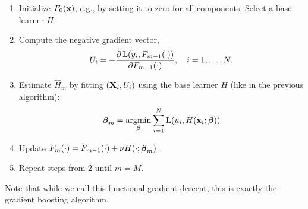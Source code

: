 \begin{enumerate}
    \item Initialize $F_0(\mathbf{x})$, e.g., by setting it to zero for all components. Select a base learner $H$.
    \item Compute the negative gradient vector,
        \begin{equation*}
            U_i=-\frac{\partial \operatorname{L}(y_i,F_{m-1}(\cdot))}{\partial F_{m-1}(\cdot)},\quad i=1,\dotsc,N.
        \end{equation*}
    \item Estimate $\hat{H}_m$ by fitting $(\mathbf{X}_i,U_i)$ using the base learner $H$ (like in the previous algorithm):
        \begin{equation*}
            \boldsymbol{\beta}_m=\operatorname*{argmin}_{\boldsymbol{\beta}}\sum_{i=1}^N\operatorname{L}(u_i,H(\mathbf{x}_i;\boldsymbol{\beta}))
        \end{equation*}
    \item Update $F_m(\cdot)=F_{m-1}(\cdot)+\nu H(\cdot;\boldsymbol{\beta}_m)$.
    \item Repeat steps from 2 until $m=M$.
\end{enumerate}
Note that while we call this functional gradient descent, this is exactly the gradient boosting algorithm.
